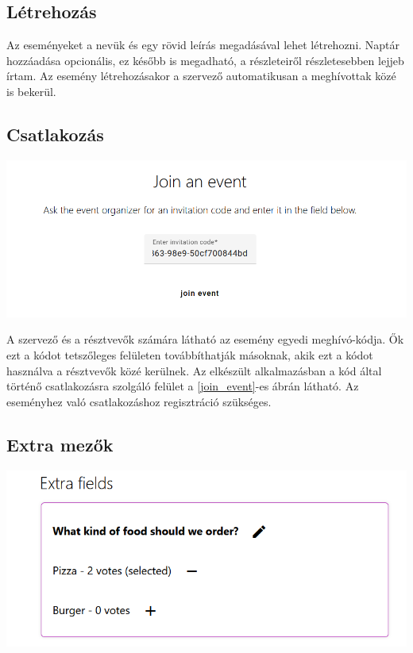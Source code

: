 \documentclass[a4paper,12pt]{report}
\theoremstyle{definition}
\theoremstyle{remark}
\begin{document}
	\subsection{Létrehozás}

Az eseményeket a nevük és egy rövid leírás megadásával lehet létrehozni. Naptár hozzáadása opcionális, ez később is megadható, a részleteiről részletesebben lejjeb írtam.  Az esemény létrehozásakor a szervező automatikusan a meghívottak közé is bekerül.

	\subsection{Csatlakozás}

\begin{center}
\includegraphics[width=150mm]{join_event}
\captionsetup{width=0.8\linewidth}
\label{join_event}
\end{center}


A szervező és a résztvevők számára látható az esemény egyedi meghívó-kódja. Ők ezt a kódot tetszőleges felületen továbbíthatják másoknak, akik ezt a kódot használva a résztvevők közé kerülnek. Az elkészült alkalmazásban a kód által történő csatlakozásra szolgáló felület a \ref{join_event}-es ábrán látható. Az eseményhez való csatlakozáshoz regisztráció szükséges.

	\subsection{Extra mezők}

\begin{center}
\includegraphics[width=150mm]{extra_field_food}
\captionsetup{width=0.8\linewidth}
\label{extra_field_food}
\end{center}
\end{document}
